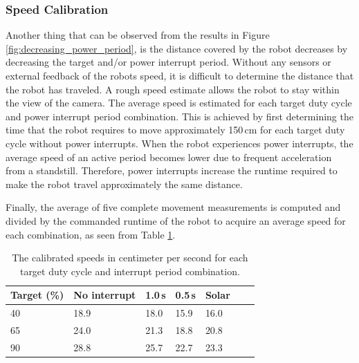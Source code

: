 \subsubsection{Speed Calibration}
Another thing that can be observed from the results in Figure \ref{fig:decreasing_power_period}, is the distance covered by the robot decreases by decreasing the target and/or power interrupt period.
Without any sensors or external feedback of the robots speed, it is difficult to determine the distance that the robot has traveled.
A rough speed estimate allows the robot to stay within the view of the camera.
The average speed is estimated for each target duty cycle and power interrupt period combination.
This is achieved by first determining the time that the robot requires to move approximately 150\,cm for each target duty cycle without power interrupts.
When the robot experiences power interrupts, the average speed of an active period becomes lower due to frequent acceleration from a standstill.
Therefore, power interrupts increase the runtime required to make the robot travel approximately the same distance.

Finally, the average of five complete movement measurements is computed and divided by the commanded runtime of the robot to acquire an average speed for each combination, as seen from Table \ref{tab:val_calib}.


\begin{table}[t]
	\centering
	\small
	\caption{The calibrated speeds in centimeter per second for each target duty cycle and interrupt period combination.}
	\label{tab:val_calib}
	\begin{tabular}{|l||l|l|l|l|l|l|}
		\hline
		Target (\%) & No interrupt & 1.0\,s & 0.5\,s & Solar \\
		\hline \hline
		 40 & 18.9 & 18.0 & 15.9 & 16.0\\
	     65 & 24.0 & 21.3 & 18.8 & 20.8\\
		 90 & 28.8 & 25.7 & 22.7 & 23.3 \\
		\hline
	\end{tabular}
\end{table}


